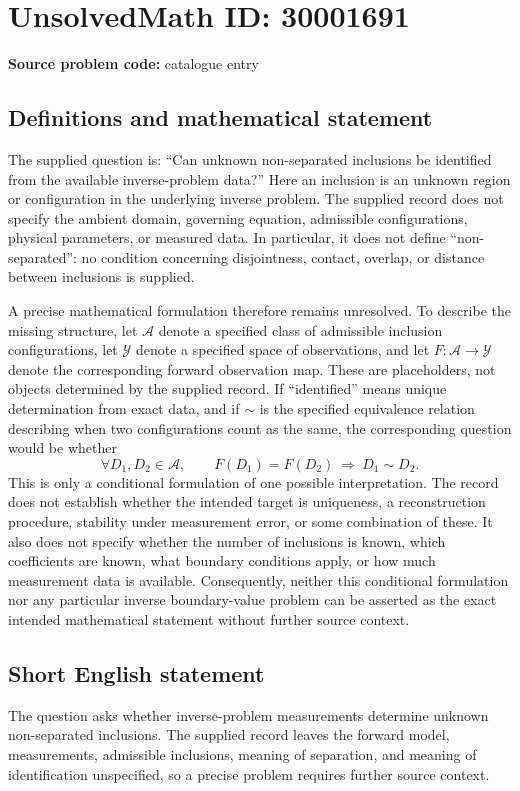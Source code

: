 \documentclass[11pt]{article}
\begin{document}
\section*{UnsolvedMath ID: 30001691}
\textbf{Source problem code:} catalogue entry
\subsection{Definitions and mathematical statement}
The supplied question is: ``Can unknown non-separated inclusions be identified from the available inverse-problem data?'' Here an inclusion is an unknown region or configuration in the underlying inverse problem. The supplied record does not specify the ambient domain, governing equation, admissible configurations, physical parameters, or measured data. In particular, it does not define ``non-separated'': no condition concerning disjointness, contact, overlap, or distance between inclusions is supplied.

A precise mathematical formulation therefore remains unresolved. To describe the missing structure, let \(\mathcal A\) denote a specified class of admissible inclusion configurations, let \(\mathcal Y\) denote a specified space of observations, and let \(F\colon\mathcal A\to\mathcal Y\) denote the corresponding forward observation map. These are placeholders, not objects determined by the supplied record. If ``identified'' means unique determination from exact data, and if \(\sim\) is the specified equivalence relation describing when two configurations count as the same, the corresponding question would be whether
\[
\forall D_1,D_2\in\mathcal A,\qquad F(D_1)=F(D_2)\ \Longrightarrow\ D_1\sim D_2.
\]
This is only a conditional formulation of one possible interpretation. The record does not establish whether the intended target is uniqueness, a reconstruction procedure, stability under measurement error, or some combination of these. It also does not specify whether the number of inclusions is known, which coefficients are known, what boundary conditions apply, or how much measurement data is available. Consequently, neither this conditional formulation nor any particular inverse boundary-value problem can be asserted as the exact intended mathematical statement without further source context.
\subsection{Short English statement}
The question asks whether inverse-problem measurements determine unknown non-separated inclusions. The supplied record leaves the forward model, measurements, admissible inclusions, meaning of separation, and meaning of identification unspecified, so a precise problem requires further source context.
\end{document}
